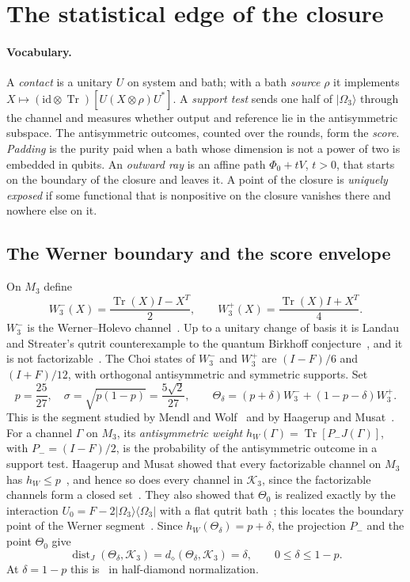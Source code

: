 \documentclass[11pt]{article}
\theoremstyle{definition}
\theoremstyle{remark}
\DeclareMathOperator{\Tr}{Tr}
\DeclareMathOperator{\dist}{dist}
\newcommand{\id}{\mathrm{id}}
\newcommand{\K}{\mathcal K}
\newcommand{\ket}[1]{\lvert#1\rangle}
\newcommand{\bra}[1]{\langle#1\rvert}
\newcommand{\Wminus}{W_3^-}
\newcommand{\Wplus}{W_3^+}
\begin{document}
\section{The statistical edge of the closure}\label{sec:edge}

\paragraph{Vocabulary.}
A \emph{contact} is a unitary $U$ on system and bath; with a bath \emph{source} $\rho$ it implements $X\mapsto(\id\otimes\Tr)[U(X\otimes\rho)U^*]$. A \emph{support test} sends one half of $\ket{\Omega_3}$ through the channel and measures whether output and reference lie in the antisymmetric subspace. The antisymmetric outcomes, counted over the rounds, form the \emph{score}. \emph{Padding} is the purity paid when a bath whose dimension is not a power of two is embedded in qubits. An \emph{outward ray} is an affine path $\Phi_0+tV$, $t>0$, that starts on the boundary of the closure and leaves it. A point of the closure is \emph{uniquely exposed} if some functional that is nonpositive on the closure vanishes there and nowhere else on it.

\subsection{The Werner boundary and the score envelope}

On $M_3$ define
\[
 \Wminus(X)=\frac{\Tr(X)I-X^T}{2},\qquad
 \Wplus(X)=\frac{\Tr(X)I+X^T}{4}.
\]
$\Wminus$ is the Werner--Holevo channel~\cite{WernerHolevo}. Up to a unitary change of basis it is Landau and Streater's qutrit counterexample to the quantum Birkhoff conjecture~\cite{LandauStreater}, and it is not factorizable~\cite[Example~3.1]{HM2011}. The Choi states of $\Wminus$ and $\Wplus$ are $(I-F)/6$ and $(I+F)/12$, with orthogonal antisymmetric and symmetric supports. Set
\begin{equation}\label{eq:werner-family}
 p=\frac{25}{27},\quad \sigma=\sqrt{p(1-p)}=\frac{5\sqrt2}{27},\qquad
 \Theta_\delta=(p+\delta)\Wminus+(1-p-\delta)\Wplus.
\end{equation}
This is the segment studied by Mendl and Wolf~\cite{MendlWolf} and by Haagerup and Musat~\cite[Sections~5 and~6]{HM2015}.
For a channel $\Gamma$ on $M_3$, its \emph{antisymmetric weight} $h_W(\Gamma)=\Tr[P_-J(\Gamma)]$, with $P_-=(I-F)/2$, is the probability of the antisymmetric outcome in a support test. Haagerup and Musat showed that every factorizable channel on $M_3$ has $h_W\le p$~\cite[Lemmas~5.4 and~5.5]{HM2015}, and hence so does every channel in $\K_3$, since the factorizable channels form a closed set~\cite[Remark~1.4(b)]{HM2011}. They also showed that $\Theta_0$ is realized exactly by the interaction $U_0=F-2\ket{\Omega_3}\bra{\Omega_3}$ with a flat qutrit bath~\cite[Theorem~5.6(1)]{HM2015}; this locates the boundary point of the Werner segment~\cite[Corollary~5.7]{HM2015}. Since $h_W(\Theta_\delta)=p+\delta$, the projection $P_-$ and the point $\Theta_0$ give
\[
 \dist_J(\Theta_\delta,\K_3)=d_\diamond(\Theta_\delta,\K_3)=\delta,
 \qquad 0\le\delta\le1-p.
\]
At $\delta=1-p$ this is~\cite[Theorem~5.6(2)]{HM2015} in half-diamond normalization.
\end{document}

